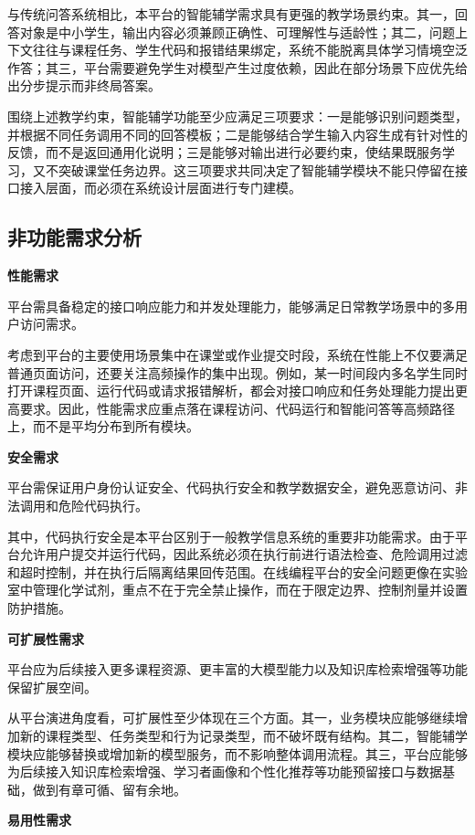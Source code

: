 与传统问答系统相比，本平台的智能辅学需求具有更强的教学场景约束。其一，回答对象是中小学生，输出内容必须兼顾正确性、可理解性与适龄性；其二，问题上下文往往与课程任务、学生代码和报错结果绑定，系统不能脱离具体学习情境空泛作答；其三，平台需要避免学生对模型产生过度依赖，因此在部分场景下应优先给出分步提示而非终局答案\cite{pirzado2024pitfalls,gonzalez2025k12gpt}。

围绕上述教学约束，智能辅学功能至少应满足三项要求：一是能够识别问题类型，并根据不同任务调用不同的回答模板；二是能够结合学生输入内容生成有针对性的反馈，而不是返回通用化说明；三是能够对输出进行必要约束，使结果既服务学习，又不突破课堂任务边界。这三项要求共同决定了智能辅学模块不能只停留在接口接入层面，而必须在系统设计层面进行专门建模。

\subsection{非功能需求分析}
\textbf{性能需求}

平台需具备稳定的接口响应能力和并发处理能力，能够满足日常教学场景中的多用户访问需求。

考虑到平台的主要使用场景集中在课堂或作业提交时段，系统在性能上不仅要满足普通页面访问，还要关注高频操作的集中出现。例如，某一时间段内多名学生同时打开课程页面、运行代码或请求报错解析，都会对接口响应和任务处理能力提出更高要求。因此，性能需求应重点落在课程访问、代码运行和智能问答等高频路径上，而不是平均分布到所有模块。

\textbf{安全需求}

平台需保证用户身份认证安全、代码执行安全和教学数据安全，避免恶意访问、非法调用和危险代码执行。

其中，代码执行安全是本平台区别于一般教学信息系统的重要非功能需求。由于平台允许用户提交并运行代码，因此系统必须在执行前进行语法检查、危险调用过滤和超时控制，并在执行后隔离结果回传范围。在线编程平台的安全问题更像在实验室中管理化学试剂，重点不在于完全禁止操作，而在于限定边界、控制剂量并设置防护措施。

\textbf{可扩展性需求}

平台应为后续接入更多课程资源、更丰富的大模型能力以及知识库检索增强等功能保留扩展空间。

从平台演进角度看，可扩展性至少体现在三个方面。其一，业务模块应能够继续增加新的课程类型、任务类型和行为记录类型，而不破坏既有结构。其二，智能辅学模块应能够替换或增加新的模型服务，而不影响整体调用流程。其三，平台应能够为后续接入知识库检索增强、学习者画像和个性化推荐等功能预留接口与数据基础，做到有章可循、留有余地。

\textbf{易用性需求}

